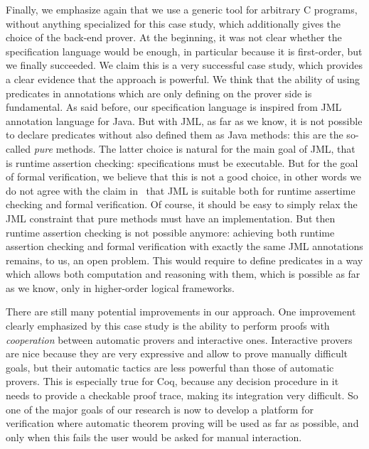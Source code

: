 Finally, we emphasize again that we use a generic tool for arbitrary C
programs, without anything specialized for this case study, which
additionally gives the choice of the back-end prover. At the
beginning, it was not clear whether the \caduceus{} specification
language would be enough, in particular because it is first-order, but
we finally succeeded.  We claim this is a very successful case study,
which provides a clear evidence that the \caduceus{} approach is
powerful. We think that the ability of using predicates in annotations
which are only defining on the prover side is fundamental. As said
before, our specification language is inspired from JML annotation
language for Java. But with JML, as far as we know, it is not possible
to declare predicates without also defined them as Java methods: this
are the so-called \emph{pure} methods. The latter choice is natural
for the main goal of JML, that is runtime assertion checking:
specifications must be executable. But for the goal of formal
verification, we believe that this is not a good choice, in other
words we do not agree with the claim in~\cite{leavens03a} that JML is
suitable both for runtime assertime checking and formal verification.
Of course, it should be easy to simply relax the JML constraint that
pure methods must have an implementation. But then runtime assertion
checking is not possible anymore: achieving both runtime assertion
checking and formal verification with exactly the same JML annotations
remains, to us, an open problem. This would require to define
predicates in a way which allows both computation and reasoning with
them, which is possible as far as we know, only in higher-order
logical frameworks.

There are still many potential improvements in our approach. One
improvement clearly emphasized by this case study is the ability to
perform proofs with \emph{cooperation} between automatic provers and
interactive ones. Interactive provers are nice because they are very
expressive and allow to prove manually difficult goals, but their
automatic tactics are less powerful than those of automatic provers. This is
especially true for Coq, because any decision procedure in it needs to
provide a checkable proof trace, making its integration very
difficult. So one of the major goals of our research is now to develop
a platform for verification where automatic theorem proving will be
used as far as possible, and only when this fails the user would be asked
for manual interaction.

